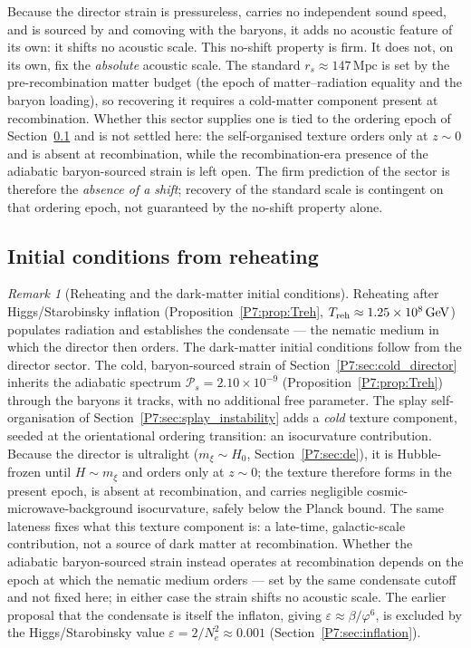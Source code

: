 \documentclass[11pt,a4paper]{article}
\theoremstyle{definition}
\theoremstyle{remark}
\newtheorem{remark}[theorem]{Remark}
\newcommand{\vp}{\varphi}
\begin{document}
Because the director strain is pressureless, carries no independent sound
speed, and is sourced by and comoving with the baryons, it adds no
acoustic feature of its own: it shifts no acoustic scale.  This no-shift
property is firm.  It does not, on its own,
fix the \emph{absolute} acoustic scale.  The standard
$r_s\approx147\,\mathrm{Mpc}$ is set by the pre-recombination matter budget
(the epoch of matter--radiation equality and the baryon loading), so
recovering it requires a cold-matter component present at recombination.
Whether this sector supplies one is tied to the ordering epoch of
Section~\ref{P7:sec:dm_ic} and is not settled here: the self-organised
texture orders only at $z\sim0$ and is absent at recombination, while the
recombination-era presence of the adiabatic baryon-sourced strain is left
open.  The firm prediction of the sector is therefore the \emph{absence of
a shift}; recovery of the standard scale is contingent on that ordering
epoch, not guaranteed by the no-shift property alone.

\subsection{Initial conditions from reheating}
\label{P7:sec:dm_ic}

\begin{remark}[Reheating and the dark-matter initial conditions]
\label{P7:rem:reheating_IC}
Reheating after Higgs/Starobinsky inflation
(Proposition~\ref{P7:prop:Treh}, $T_{\rm reh}\approx1.25\times10^8\,\mathrm{GeV}$)
populates radiation and establishes the condensate --- the nematic medium
in which the director then orders.  The dark-matter initial conditions
follow from the director sector.  The cold, baryon-sourced strain of
Section~\ref{P7:sec:cold_director} inherits the adiabatic spectrum
$\mathcal{P}_s=2.10\times10^{-9}$ (Proposition~\ref{P7:prop:Treh}) through
the baryons it tracks, with no additional free parameter.  The splay
self-organisation of Section~\ref{P7:sec:splay_instability} adds a
\emph{cold} texture component, seeded at the orientational ordering
transition: an isocurvature contribution.  Because the director is
ultralight ($m_\xi\sim H_0$, Section~\ref{P7:sec:de}), it is Hubble-frozen
until $H\sim m_\xi$ and orders only at $z\sim0$; the texture therefore
forms in the present epoch, is absent at recombination, and carries
negligible cosmic-microwave-background isocurvature, safely below the
Planck bound.  The same lateness fixes what this texture component is: a
late-time, galactic-scale contribution, not a source of dark matter at
recombination.  Whether the adiabatic baryon-sourced strain instead
operates at recombination depends on the epoch at which the nematic medium
orders --- set by the same condensate cutoff and not fixed here; in either
case the strain shifts no acoustic scale.  The earlier proposal that the
condensate is itself the inflaton, giving $\varepsilon\approx\beta/\vp^6$,
is excluded by the Higgs/Starobinsky value
$\varepsilon=2/N_e^2\approx0.001$ (Section~\ref{P7:sec:inflation}).
\end{remark}
\end{document}
